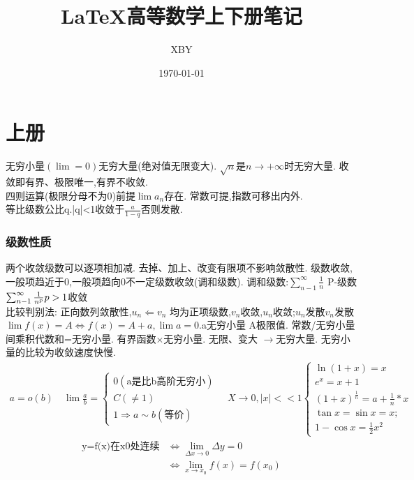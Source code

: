 \documentclass[10pt, a4paper, oneside]{ctexart}
\title{\LaTeX 高等数学上下册笔记}
\author{XBY}
\date{\today}
\begin{document}
\begin{sloppypar}
	\maketitle
	\setcounter{tocdepth}{4}
	\tableofcontents
	\setcounter{page}{0}

	\def\oiint{{\bigcirc}\kern-11.5pt{\int}\kern-6.5pt{\int}}
	\def\oiiint{{\bigcirc}\kern-12.3pt{\int}\kern-7pt{\int}\kern-7pt{\int}}

	\newpage
	\section{上册}
	无穷小量$(\lim=0)$无穷大量(绝对值无限变大).
	$\sqrt{n}$是$n\to+\infty$时无穷大量.
	收敛即有界、极限唯一,有界不收敛.\\
	四则运算(极限分母不为0)前提$\lim a_n$存在.
	常数可提,指数可移出内外.\\
	等比级数公比q.|q|<1收敛于$\frac{a}{1-q}$否则发散.

	\subsubsection{级数性质}
	两个收敛级数可以逐项相加减.
	去掉、加上、改变有限项不影响敛散性.
	级数收敛,一般项趋近于0,一般项趋向0不一定级数收敛(调和级数).
	调和级数:$\sum_{n - 1}^{\infty}\frac{1}{n}$
	P-级数 $\sum_{n - 1}^{\infty}\frac{1}{n^p}\space p>1$收敛\\
	比较判别法:
	正向数列敛散性,$u_n\Leftarrow v_n$ 均为正项级数,$v_n$收敛,$u_n$收敛;$u_n$发散$v_n$发散
	$\lim f(x) = A \Leftrightarrow f(x) = A + a,\lim a = 0$.a无穷小量 A极限值.
	常数/无穷小量间乘积代数和=无穷小量.
	有界函数$\times$无穷小量.
	无限、变大 $\to$无穷大量.
	无穷小量的比较为收敛速度快慢.
	\begin{gather*}
		a=o(b)\quad
		\lim \frac{a}{b}=\begin{cases}
			0(\text{a是比b高阶无穷小}) \\
			C(\neq 1)                  \\
			1 \Rightarrow a \sim b(\text{等价})
		\end{cases}\quad
		X\to 0,|x| << 1
		\begin{cases}
			\ln(1+x)=x                                \\
			e^x = x + 1                               \\
			(1+x)^{\frac{1}{n}} = a + \frac{1}{n} * x \\
			\tan x = \sin x = x;                      \\
			1-\cos x = \frac{1}{2}x^2
		\end{cases}
	\end{gather*}
	\begin{align*}
		\text{y=f(x)在x0处连续} & \Leftrightarrow \lim_{\Delta x\to0}\Delta y=0 \\
		                        & \Leftrightarrow \lim_{x\to x_0}f(x)=f(x_0)
	\end{align*}


\end{sloppypar}
\end{document}
